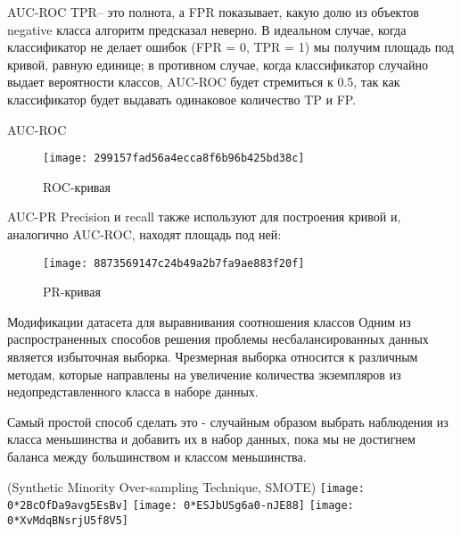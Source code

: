 \documentclass[11pt]{beamer}
\begin{document}
\begin{frame}{AUC-ROC}
TPR-- это полнота, а FPR показывает, какую долю из объектов negative класса алгоритм предсказал неверно. В идеальном случае, когда классификатор не делает ошибок (FPR = 0, TPR = 1) мы получим площадь под кривой, равную единице; в противном случае, когда классификатор случайно выдает вероятности классов, AUC-ROC будет стремиться к 0.5, так как классификатор будет выдавать одинаковое количество TP и FP.
\end{frame}

\begin{frame}{AUC-ROC}
\begin{figure}[hhh!]
	\begin{center}
		\texttt{[image: 299157fad56a4ecca8f6b96b425bd38c]}
	\end{center}
	\vspace{-5mm}\caption{ROC-кривая}
\end{figure}

\end{frame}

\begin{frame}{AUC-PR}
	Precision и recall также используют для построения кривой и, аналогично AUC-ROC, находят площадь под ней:
	
	\begin{figure}[hhh!]
		\begin{center}
			\texttt{[image: 8873569147c24b49a2b7fa9ae883f20f]}
		\end{center}
		\vspace{-5mm}\caption{PR-кривая}
	\end{figure}
\end{frame}

\begin{frame}{Модификации датасета для выравнивания соотношения классов}
	Одним из распространенных способов решения проблемы несбалансированных данных является избыточная выборка. Чрезмерная выборка относится к различным методам, которые направлены на увеличение количества экземпляров из недопредставленного класса в наборе данных.
	
	Самый простой способ сделать это - случайным образом выбрать наблюдения из класса меньшинства и добавить их в набор данных, пока мы не достигнем баланса между большинством и классом меньшинства. 
	
\end{frame}

\begin{frame}{(Synthetic Minority Over-sampling Technique, SMOTE)}
	\hfil\hfil\texttt{[image: 0*2BcOfDa9avg5EsBv]}\newline
	\null\hfil\hfil{}\newline
	\vfil
	\hfil\hfil\texttt{[image: 0*ESJbUSg6a0-nJE88]}\hfil\hfil
	\texttt{[image: 0*XvMdqBNsrjU5f8V5]}\newline
	\null\hfil\hfil{}
	\hfil\hfil{}
\end{frame}
\end{document}
